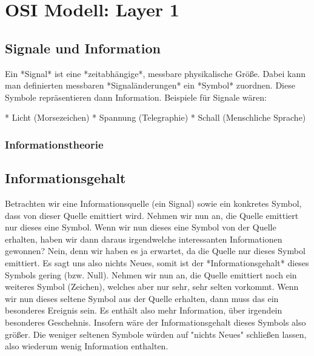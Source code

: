 \section{ OSI Modell: Layer 1}


\subsection{ Signale und Information}

Ein *Signal* ist eine *zeitabhängige*, messbare physikalische Größe. Dabei kann
man definierten messbaren *Signaländerungen* ein *Symbol* zuordnen. Diese
Symbole repräsentieren dann Information. Beispiele für Signale wären:

* Licht (Morsezeichen)
* Spannung (Telegraphie)
* Schall (Menschliche Sprache)

\subsubsection{ Informationstheorie}

\subsection{ Informationsgehalt}

Betrachten wir eine Informationsquelle (ein Signal) sowie ein konkretes Symbol,
dass von dieser Quelle emittiert wird. Nehmen wir nun an, die Quelle emittiert
nur dieses eine Symbol. Wenn wir nun dieses eine Symbol von der Quelle erhalten,
haben wir dann daraus irgendwelche interessanten Informationen gewonnen? Nein,
denn wir haben es ja erwartet, da die Quelle nur dieses Symbol emittiert. Es
sagt uns also nichts Neues, somit ist der *Informationsgehalt* dieses Symbols
gering (bzw. Null). Nehmen wir nun an, die Quelle emittiert noch ein weiteres
Symbol (Zeichen), welches aber nur sehr, sehr selten vorkommt. Wenn wir nun
dieses seltene Symbol aus der Quelle erhalten, dann muss das ein besonderes
Ereignis sein. Es enthält also mehr Information, über irgendein besonderes
Geschehnis. Insofern wäre der Informationsgehalt dieses Symbols also größer. Die
weniger seltenen Symbole würden auf "nichts Neues" schließen lassen, also
wiederum wenig Information enthalten.

